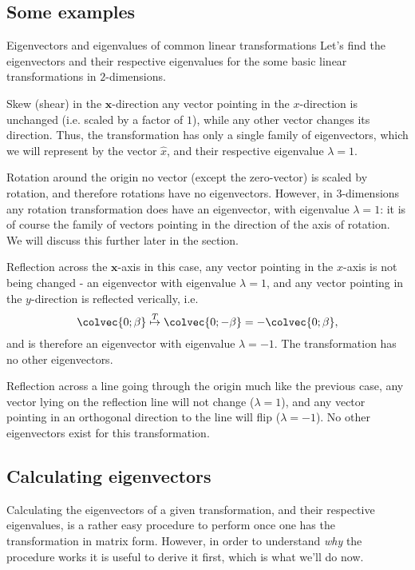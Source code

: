 \subsection{Some examples}
\begin{example}{Eigenvectors and eigenvalues of common linear transformations}{}
	Let's find the eigenvectors and their respective eigenvalues for the some basic linear transformations in $2$-dimensions.

	\begin{descitemize}
		\item[Skew (shear) in the $\bm{x}$-direction] any vector pointing in the $x$-direction is unchanged (i.e. scaled by a factor of $1$), while any other vector changes its direction. Thus, the transformation has only a single family of eigenvectors, which we will represent by the vector $\hat{x}$, and their respective eigenvalue $\lambda=1$.

		\item[Rotation around the origin] no vector (except the zero-vector) is scaled by rotation, and therefore rotations have no eigenvectors. However, in $3$-dimensions any rotation transformation does have an eigenvector, with eigenvalue $\lambda=1$: it is of course the family of vectors pointing in the direction of the axis of rotation. We will discuss this further later in the section.
		
		\item[Reflection across the $\bm{x}$-axis] in this case, any vector pointing in the $x$-axis is not being changed - an eigenvector with eigenvalue $\lambda=1$, and any vector pointing in the $y$-direction is reflected verically, i.e.
			\[
				\colvec{0;\beta} \overset{T}{\mapsto} \colvec{0;-\beta} = -\colvec{0;\beta},
			\]
			and is therefore an eigenvector with eigenvalue $\lambda=-1$. The transformation has no other eigenvectors.

		\item[Reflection across a line going through the origin] much like the previous case, any vector lying on the reflection line will not change ($\lambda=1$), and any vector pointing in an orthogonal direction to the line will flip ($\lambda=-1$). No other eigenvectors exist for this transformation.
	\end{descitemize}
\end{example}

\subsection{Calculating eigenvectors}
Calculating the eigenvectors of a given transformation, and their respective eigenvalues, is a rather easy procedure to perform once one has the transformation in matrix form. However, in order to understand \textit{why} the procedure works it is useful to derive it first, which is what we'll do now.


